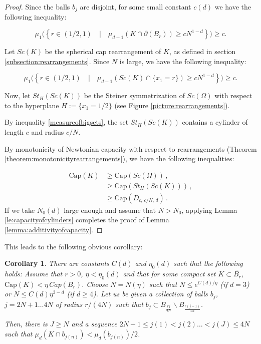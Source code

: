 \documentclass{amsart}
\newtheorem{corollary}[theorem]{Corollary}
\begin{document}
\begin{proof}

Since the balls $b_j$ are disjoint, for some small constant $c(d)$ we have the following inequality:

\begin{equation}
    \mu_1 \bigg( \left\{ r \in (1/2,1) \quad | \quad \mu_{d-1}(K \cap \partial(B_r))  \geq  c N^{1-d}\right\}\bigg) \geq c.
\end{equation}

Let $Sc(K)$ be the spherical cap rearrangement of $K$, as defined in section \ref{subsection:rearrangements}. Since $N$ is large, we have the following inequality:

\begin{equation}\label{measureofbigsets}
    \mu_1\bigg({\left\{ r \in (1/2,1) \quad | \quad \mu_{d-1}(Sc(K) \cap \{x_1 = r \})  \geq  c N^{1-d}\right\}}\bigg) \geq c.
\end{equation}

Now, let $St_{H}(Sc(K))$ be the Steiner symmetrization of $Sc(\Omega)$ with respect to the hyperplane \linebreak $H:=\{x_1 = 1/2\}$ (see Figure \ref{picture:rearrangements}).

By inequality \eqref{measureofbigsets}, the set $St_{H}(Sc(K))$ contains a cylinder of length $c$ and radius $c/N$. 

By monotonicity of Newtonian capacity with respect to rearrangements (Theorem \ref{theorem:monotonicityrearrangements}), we have the following inequalities:

\begin{align}
    \text{Cap}(K) &\geq \text{Cap}(Sc(\Omega))\, ,\nonumber\\
    &\geq \text{Cap}(St_H(Sc(K))) \, ,\nonumber\\
    &\geq \text{Cap}(D_{c, \,c/N,\, d}) \, .
\end{align}
If we take $N_0(d)$ large enough and assume that $N > N_0$, applying Lemma \ref{le:capacityofcylinders} completes the proof of Lemma \ref{lemma:additivityofcapacity}.

    
\end{proof}

This leads to the following obvious corollary:


\begin{corollary}\label{cor:totalcapacityonannuli}
There are constants $C(d)$ and $\eta_0(d)$ such that the following holds:
    Assume that $r>0$, $\eta < \eta_0(d)$ and that for some compact set $K \subset \overline{B_r}$, $\text{Cap}(K) < \eta \, Cap(B_r)$. Choose $N=N(\eta)$ such that $N \leq e^{C(d)/\eta}$ (if $d=3$) or $N \leq C(d)\eta^{3-d}$ (if $d \geq 4$). Let us be given a collection of balls $b_j$, $j=2N+1 \ldots 4N$ of radius $r/(4N)$ such that $b_j \subset B_{\frac{rj}{4N}} \backslash B_{\frac{r(j-1)}{4N}}$.
    
    Then, there is $J \geq N$ and a sequence $2N+1 \leq j(1) < j(2) \ldots < j(J) \leq 4N$ such that \linebreak $\mu_d\left( K \cap b_{j(n)}\right) <  \mu_d(b_{j(n)})/2$.
    
\end{corollary}
\end{document}
